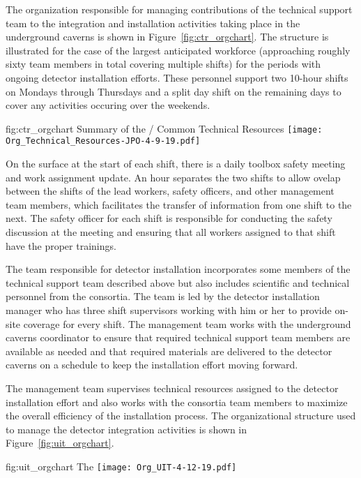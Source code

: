 The organization responsible for managing contributions of 
the technical support team to the integration and installation 
activities taking place in the underground caverns is shown 
in Figure~\ref{fig:ctr_orgchart}.  The structure is illustrated
for the case of the largest anticipated workforce (approaching 
roughly sixty team members in total covering multiple shifts) 
for the periods with ongoing detector installation efforts.
These personnel support two 10-hour shifts on Mondays through 
Thursdays and a split day shift on the remaining days to cover 
any activities occuring over the weekends. 
\begin{dunefigure}{fig:ctr_orgchart}
  {Summary of the / Common Technical Resources}
  \texttt{[image: Org\_Technical\_Resources-JPO-4-9-19.pdf]}
\end{dunefigure}

On the surface at the start of each shift, there is a daily 
toolbox safety meeting and work assignment update. An hour 
separates the two shifts to allow ovelap between the shifts 
of the lead workers, safety officers, and other management 
team members, which facilitates the transfer of information 
from one shift to the next. The safety officer for each shift 
is responsible for conducting the safety discussion at the 
meeting and ensuring that all workers assigned to that shift 
have the proper trainings.

The team responsible for detector installation incorporates 
some members of the technical support team described above 
but also includes scientific and technical personnel from 
the  consortia.  The team is led by the detector 
installation manager who has three shift supervisors working 
with him or her to provide on-site coverage for every shift.
The management team works with the underground caverns 
coordinator to ensure that required technical support team 
members are available as needed and that required materials 
are delivered to the detector caverns on a schedule to keep
the installation effort moving forward.         

The management team supervises technical resources assigned to 
the detector installation effort and also works with the consortia 
team members to maximize the overall efficiency of the installation 
process.  The organizational structure used to manage the detector 
integration activities is shown in Figure~\ref{fig:uit_orgchart}.

\begin{dunefigure}{fig:uit_orgchart}
  {The }
  \texttt{[image: Org\_UIT-4-12-19.pdf]}
\end{dunefigure}

